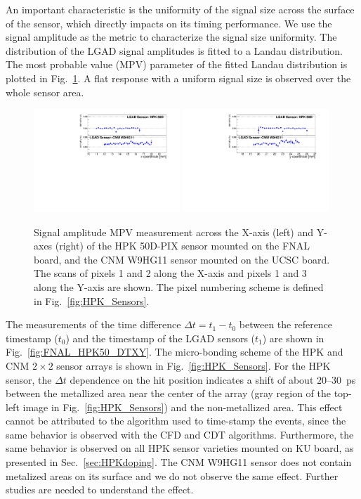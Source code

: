 \documentclass[preprint,1p]{elsarticle}
\begin{document}
An important characteristic is the uniformity of the signal size
across the surface of the sensor, which directly impacts on its timing performance. We use the signal amplitude as the metric to characterize the signal
size uniformity. The distribution of the LGAD signal amplitudes is fitted to a
Landau distribution. The most probable value (MPV) parameter of the fitted
Landau distribution is plotted in Fig.~\ref{fig:FNAL_HPK50_MPVXY}. 
A flat response with a uniform signal size is observed over the whole sensor area.

\begin{figure}[htbp] 
\centering
\includegraphics[width=0.49\textwidth]{figs/HPK50DVsCNM_MPV_vs_X.pdf} 
\includegraphics[width=0.49\textwidth]{figs/HPK50DVsCNM_MPV_vs_Y.pdf} 
\caption{Signal amplitude MPV measurement across the X-axis (left) and Y-axes (right) of 
the HPK 50D-PIX sensor mounted on the FNAL board, and the CNM W9HG11 sensor mounted on 
the UCSC board. The scans of pixels 1 and 2 along the X-axis and pixels 1 and 3 
along the Y-axis are shown. The pixel numbering scheme is defined in Fig.~\ref{fig:HPK_Sensors}.} 
\label{fig:FNAL_HPK50_MPVXY} 
\end{figure} 


The measurements of the time difference $\Delta t = t_{1}-t_{0}$ between the
reference timestamp ($t_0$) and the timestamp of the LGAD sensors ($t_1$) are
shown in Fig.~\ref{fig:FNAL_HPK50_DTXY}. The micro-bonding scheme of the HPK and
CNM $2\times 2$ sensor arrays is shown in Fig.~\ref{fig:HPK_Sensors}. For the
HPK sensor, the $\Delta t$ dependence on the hit position indicates a shift of
about $20$--$30$~ps between the metallized area near the center of the array
(gray region of the top-left image in Fig.~\ref{fig:HPK_Sensors}) and the
non-metallized area. 
This effect cannot be attributed to the algorithm used to time-stamp the events,
since the same behavior is observed with the CFD and CDT algorithms.
Furthermore, the same behavior is observed on all HPK sensor varieties mounted
on KU board, as presented in Sec.~\ref{sec:HPKdoping}.  The CNM W9HG11 sensor
does not contain metalized areas on its surface and we do not observe the same effect. Further
studies are needed to understand the effect.
\end{document}

